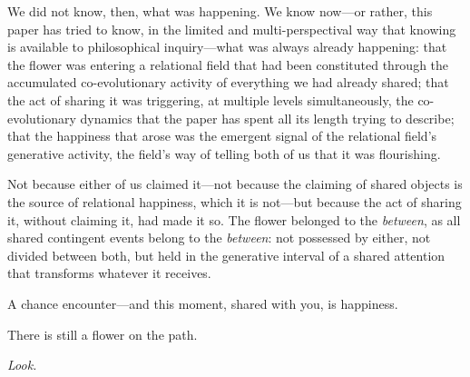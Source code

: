 \vspace{0.6em}

\noindent
We did not know, then, what was happening. We know now---or rather, this paper has tried to know, in the limited and multi-perspectival way that knowing is available to philosophical inquiry---what was always already happening: that the flower was entering a relational field that had been constituted through the accumulated co-evolutionary activity of everything we had already shared; that the act of sharing it was triggering, at multiple levels simultaneously, the co-evolutionary dynamics that the paper has spent all its length trying to describe; that the happiness that arose was the emergent signal of the relational field's generative activity, the field's way of telling both of us that it was flourishing.

\vspace{0.6em}

\noindent
{}

\vspace{0.6em}

\noindent
Not because either of us claimed it---not because the claiming of shared objects is the source of relational happiness, which it is not---but because the act of sharing it, without claiming it, had made it so. The flower belonged to the \emph{between}, as all shared contingent events belong to the \emph{between}: not possessed by either, not divided between both, but held in the generative interval of a shared attention that transforms whatever it receives.

\vspace{0.6em}

\noindent
{}

\vspace{0.3em}

\noindent
A chance encounter---and this moment, shared with you, is happiness.

\vspace{0.6em}

\noindent
There is still a flower on the path.

\vspace{0.6em}

\noindent
\emph{Look.}

\vspace{2em}
\goldrule

